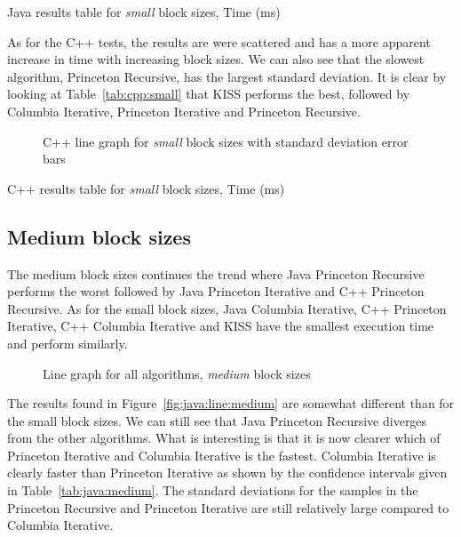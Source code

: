 \begin{table}
    \centering
    \caption{Java results table for \emph{small} block sizes, Time (ms)}
    \label{tab:java:small}
    
\end{table}

As for the C++ tests, the results are were scattered and has a more apparent increase in time with increasing block sizes. We can also see that the slowest algorithm, Princeton Recursive, has the largest standard deviation. It is clear by looking at Table~\ref{tab:cpp:small} that KISS performs the best, followed by Columbia Iterative, Princeton Iterative and Princeton Recursive.

\begin{figure}
    \centering
    
    \caption{C++ line graph for \emph{small} block sizes with standard deviation error bars}
    \label{fig:cpp:line:small}
\end{figure}

\begin{table}
    \centering
    \caption{C++ results table for \emph{small} block sizes, Time (ms)}
    \label{tab:cpp:small}
    \resizebox{\columnwidth}{!}{
        
    }
\end{table}


\subsection{Medium block sizes}
The medium block sizes continues the trend where Java Princeton Recursive performs the worst followed by Java Princeton Iterative and C++ Princeton Recursive. As for the small block sizes, Java Columbia Iterative, C++ Princeton Iterative, C++ Columbia Iterative and KISS have the smallest execution time and perform similarly.

\begin{figure}[H]
    \centering
    
    \caption{Line graph for all algorithms, \emph{medium} block sizes}
    \label{fig:all:line:medium}
\end{figure}

The results found in Figure~\ref{fig:java:line:medium} are somewhat different than for the small block sizes. We can still see that Java Princeton Recursive diverges from the other algorithms. What is interesting is that it is now clearer which of Princeton Iterative and Columbia Iterative is the fastest. Columbia Iterative is clearly faster than Princeton Iterative as shown by the confidence intervals given in Table~\ref{tab:java:medium}. The standard deviations for the samples in the Princeton Recursive and Princeton Iterative are still relatively large compared to Columbia Iterative.

